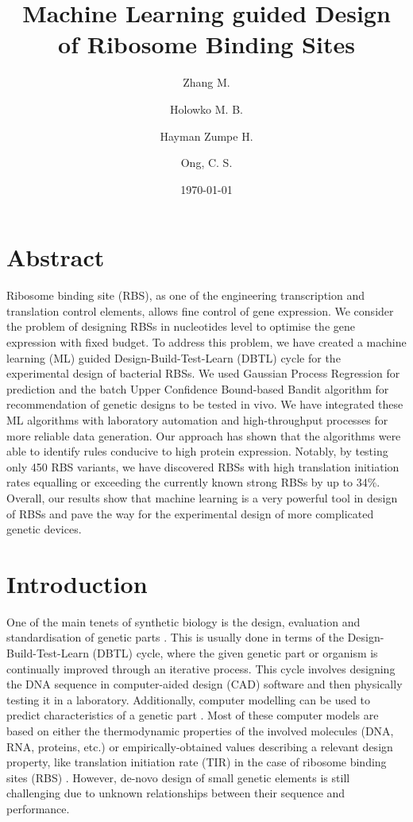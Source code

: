 \documentclass{article}
\title{Machine Learning guided Design\\
of Ribosome Binding Sites}
\author[1,2,4]{Zhang M.}
\author[3]{Holowko M. B.}
\author[3]{Hayman Zumpe H.}
\author[1,2,4]{Ong, C. S.}
\affil[1]{Machine Learning and Artificial Intelligence Future Science Platform, CSIRO}
\affil[2]{Department of Computer Science, Australian National University}
\affil[3]{CSIRO Synthetic Biology Future Science Platform, CSIRO Land and Water}
\affil[4]{Data61, CSIRO}
\date{\today{}}
\begin{document}
\maketitle

\section*{Abstract}

Ribosome binding site (RBS), as one of the engineering transcription and translation control elements, allows fine control of gene expression.
We consider the problem of designing RBSs in nucleotides level to optimise the gene expression with fixed budget. 
To address this problem, we have created a machine learning (ML) guided Design-Build-Test-Learn (DBTL) cycle for the experimental design of bacterial RBSs.
We used Gaussian Process Regression for prediction and the batch Upper Confidence Bound-based Bandit algorithm for recommendation of genetic designs to be tested in vivo.
We have integrated these ML algorithms with laboratory automation and high-throughput processes for more reliable data generation.
Our approach has shown that the algorithms were able to identify rules conducive to high protein expression.
Notably, by testing only 450 RBS variants, we have discovered 
RBSs with high translation initiation rates equalling or exceeding the currently known strong RBSs by up to 34\%.
Overall, our results show that machine learning is a very powerful tool in design of RBSs and pave the way for the experimental design of more complicated genetic devices.


\section{Introduction}

One of the main tenets of synthetic biology is the design, evaluation and standardisation of genetic parts \cite{Brophy2014,Canton2008,Stanton2014}.
This is usually done in terms of the Design-Build-Test-Learn (DBTL) cycle, where the given genetic part or organism is continually improved through an iterative process.
This cycle involves designing the DNA sequence in computer-aided design (CAD) software and then physically testing it in a laboratory. 
Additionally, computer modelling can be used to predict characteristics of a genetic part \cite{Yeoh2019,Nielsen2016}.
Most of these computer models are based on either the thermodynamic properties of the involved molecules (DNA, RNA, proteins, etc.) or empirically-obtained values describing a relevant design property, like translation initiation rate (TIR) in the case of ribosome binding sites (RBS) \cite{Xia1998,Chen2013,Reeve2014}.
However, de-novo design of small genetic elements is still challenging due to unknown relationships between their sequence and performance.\\
\end{document}
